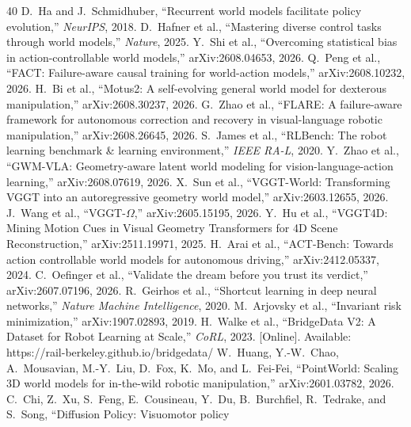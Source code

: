 \documentclass[conference]{IEEEtran}
\begin{document}

\begin{thebibliography}{40}
\setlength{\itemsep}{-1pt}
 D.~Ha and J.~Schmidhuber, ``Recurrent world models
facilitate policy evolution,'' \emph{NeurIPS}, 2018.
 D.~Hafner et al., ``Mastering diverse control
tasks through world models,'' \emph{Nature}, 2025.
 Y.~Shi et al., ``Overcoming statistical bias in
action-controllable world models,'' arXiv:2608.04653, 2026.
 Q.~Peng et al., ``FACT: Failure-aware causal training for
world-action models,'' arXiv:2608.10232, 2026.
 H.~Bi et al., ``Motus2: A self-evolving general world
model for dexterous manipulation,'' arXiv:2608.30237, 2026.
 G.~Zhao et al., ``FLARE: A failure-aware framework for
autonomous correction and recovery in visual-language robotic manipulation,''
arXiv:2608.26645, 2026.
 S.~James et al., ``RLBench: The robot learning benchmark
\& learning environment,'' \emph{IEEE RA-L}, 2020.
 Y.~Zhao et al., ``GWM-VLA: Geometry-aware latent world
modeling for vision-language-action learning,'' arXiv:2608.07619, 2026.
 X.~Sun et al., ``VGGT-World: Transforming VGGT into an
autoregressive geometry world model,'' arXiv:2603.12655, 2026.
 J.~Wang et al., ``VGGT-$\Omega$,'' arXiv:2605.15195,
2026.
 Y.~Hu et al., ``VGGT4D: Mining Motion Cues in Visual
Geometry Transformers for 4D Scene Reconstruction,'' arXiv:2511.19971, 2025.
 H.~Arai et al., ``ACT-Bench: Towards action controllable
world models for autonomous driving,'' arXiv:2412.05337, 2024.
 C.~Oefinger et al., ``Validate the dream before you
trust its verdict,'' arXiv:2607.07196, 2026.
 R.~Geirhos et al., ``Shortcut learning in deep
neural networks,'' \emph{Nature Machine Intelligence}, 2020.
 M.~Arjovsky et al., ``Invariant risk minimization,''
arXiv:1907.02893, 2019.
 H.~Walke et al., ``BridgeData V2: A Dataset for Robot
Learning at Scale,'' \emph{CoRL}, 2023. [Online]. Available:
https://rail-berkeley.github.io/bridgedata/
 W.~Huang, Y.-W.~Chao, A.~Mousavian, M.-Y.~Liu,
D.~Fox, K.~Mo, and L.~Fei-Fei, ``PointWorld: Scaling 3D world models for
in-the-wild robotic manipulation,'' arXiv:2601.03782, 2026.
 C.~Chi, Z.~Xu, S.~Feng, E.~Cousineau, Y.~Du,
B.~Burchfiel, R.~Tedrake, and S.~Song, ``Diffusion Policy: Visuomotor policy

\end{thebibliography}
\end{document}
